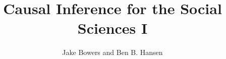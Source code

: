 \documentclass[table, xcolor = {dvipsnames}, 9pt]{beamer}
\title[]{Causal Inference for the Social Sciences I} %
\author{Jake Bowers and Ben B. Hansen}
\institute[]
{

}
\date{}
\theoremstyle{plain}
\begin{document}
\begin{frame}
\titlepage %
\end{frame}


\end{document}
